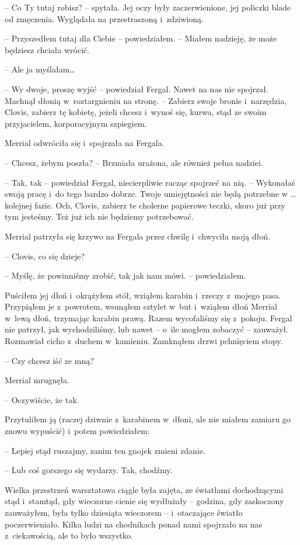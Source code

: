 \documentclass[oneside,polish,11pt,sfheadings]{mwbk}
\begin{document}
-- Co Ty tutaj robisz? -- spytała. Jej oczy były zaczerwienione, jej
policzki blade od zmęczenia. Wyglądała na przestraszoną i~zdziwioną.

-- Przyszedłem tutaj dla Ciebie -- powiedziałem. -- Miałem nadzieję, że
może będziesz chciała wrócić.

-- Ale ja myślałam\ldots

-- Wy dwoje, proszę wyjść -- powiedział Fergal. Nawet na nas nie spojrzał.
Machnął dłonią w~roztargnieniu na stronę. -- Zabierz swoje bronie i~narzędzia, Clovis, zabierz tę kobietę, jeżeli chcesz i~wynoś się, kurwa,
stąd ze swoim przyjacielem, korporacyjnym szpiegiem.

Merrial odwróciła się i~spojrzała na Fergala.

-- Chcesz, żebym poszła? -- Brzmiała urażona, ale również pełna nadziei.

-- Tak, tak -- powiedział Fergal, niecierpliwie racząc spojrzeć na nią. -- Wykonałaś swoją pracę i~do tego bardzo dobrze. Twoje umiejętności nie
będą potrzebne w \ldots kolejnej fazie. Och, Clovis, zabierz te cholerne
papierowe teczki, skoro już przy tym jesteśmy. Też już ich nie będziemy
potrzebować.

Merrial patrzyła się krzywo na Fergala przez chwilę i~chwyciła moją
dłoń.

-- Clovis, co się dzieje?

-- Myślę, że powinniśmy zrobić, tak jak nam mówi. -- powiedziałem.

Puściłem jej dłoń i~okrążyłem stół, wziąłem karabin i~rzeczy z~mojego
pasa. Przypiąłem je z~powrotem, wsunąłem sztylet w~but i~wziąłem dłoń
Merrial w~lewą dłoń, trzymając karabin prawą. Razem wycofaliśmy się z~pokoju. Fergal nie patrzył, jak wychodziliśmy, lub nawet -- o~ile mogłem
zobaczyć -- zauważył. Rozmawiał cicho z~duchem w~kamieniu. Zamknąłem
drzwi pchnięciem stopy.

-- Czy chcesz iść ze mną?

Merrial mrugnęła. 

-- Oczywiście, że tak.

Przytuliłem ją (raczej dziwnie z~karabinem w~dłoni, ale nie miałem
zamiaru go znowu wypuścić) i~potem powiedziałem: 

-- Lepiej stąd ruszajmy,
zanim ten gnojek zmieni zdanie.

-- Lub coś gorszego się wydarzy. Tak, chodźmy.

Wielka przestrzeń warsztatowa ciągle była zajęta, ze światłami
dochodzącymi stąd i~stamtąd, gdy wieczorne cienie się wydłużały -- godzina, gdy zaskoczony zauważyłem, była tylko dziesiąta wieczorem -- i~otaczające światło poczerwieniało. Kilka ludzi na chodnikach ponad nami
spojrzało na nas z~ciekawością, ale to było wszystko.
\end{document}
